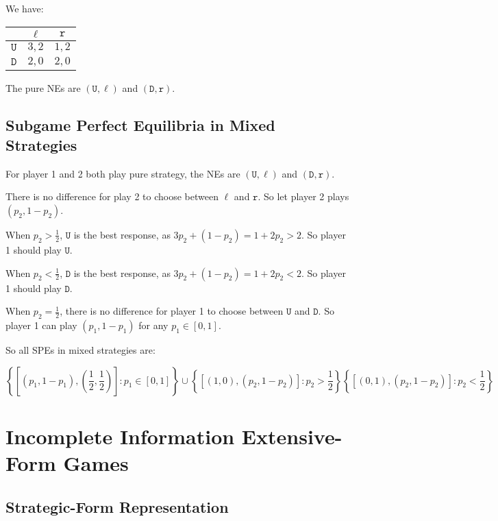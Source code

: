\documentclass{article}
\begin{document}
    We have:

    \begin{center}
    \begin{tabular}{c|c c}
    & $\ell$ & $\mathtt{r}$ \\\hline
    $\mathtt{U}$ & $3,2$ & $1,2$ \\
    $\mathtt{D}$ & $2,0$ & $2,0$
    \end{tabular}
    \end{center}

    The pure NEs are $(\mathtt{U}, \ell)$ and $(\mathtt{D}, \mathtt{r})$.

    \subsection{Subgame Perfect Equilibria in Mixed Strategies}

    For player 1 and 2 both play pure strategy, the NEs are $(\mathtt{U}, \ell)$ and $(\mathtt{D}, \mathtt{r})$.

    There is no difference for play 2 to choose between $\ell$ and $\texttt{r}$. So let player 2 plays $(p_2, 1-p_2)$.

    When $p_2>\frac{1}{2}$, $\mathtt{U}$ is the best response, as $3p_2+(1-p_2)=1+2p_2>2$. So player 1 should play $\mathtt{U}$.

    When $p_2<\frac{1}{2}$, $\mathtt{D}$ is the best response, as $3p_2+(1-p_2)=1+2p_2<2$. So player 1 should play $\mathtt{D}$.

    When $p_2=\frac{1}{2}$, there is no difference for player 1 to choose between $\mathtt{U}$ and $\mathtt{D}$. So player 1 can play $(p_1, 1-p_1)$ for any $p_1\in[0, 1]$.

    So all SPEs in mixed strategies are:

    $$
    \left\{\left[(p_1, 1-p_1), \left(\frac{1}{2}, \frac{1}{2}\right)\right]: p_1\in[0, 1]\right\}
        \cup\left\{\left[(1, 0), \left(p_2, 1-p_2\right)\right]: p_2>\frac{1}{2}\right\}\left\{\left[(0, 1), \left(p_2, 1-p_2\right)\right]: p_2<\frac{1}{2}\right\}
    $$

    \section{Incomplete Information Extensive-Form Games}

    \subsection{Strategic-Form Representation}
\end{document}

